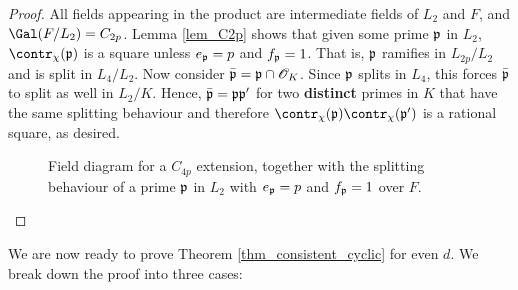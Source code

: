\begin{proof}
    All fields appearing in the product are intermediate fields of $L_2$ and $F$, and $\Gal(F/L_2)=C_{2p}$. Lemma \ref*{lem_C2p} shows that given some prime $\mathfrak{p}$ in $L_2$, $\contr_\chi(\pp)$ is a square unless $e_{\mathfrak{p}}=p$ and $f_{\mathfrak{p}}=1$. That is, $\mathfrak{p}$ ramifies in $L_{2p}/L_2$ and is split in $L_4/L_2$. Now consider $\bar{\mathfrak{p}}=\mathfrak{p}\cap\mathcal{O}_K$. Since $\mathfrak{p}$ splits in $L_4$, this forces $\bar{\mathfrak{p}}$ to split as well in $L_2/K$. Hence, $\bar{\mathfrak{p}}=\mathfrak{p}\mathfrak{p}'$ for two \textbf{distinct} primes in $K$ that have the same splitting behaviour and therefore $\contr_\chi(\pp)\contr_\chi(\pp')$ is a rational square, as desired.

    \begin{figure}[!ht]
        \centering
        \caption[short]{\centering Field diagram for a $C_{4p}$ extension, together with the splitting\\ behaviour of a prime $\mathfrak{p}$ in $L_2$ with $e_{\mathfrak{p}}=p$ and $f_{\mathfrak{p}}=1$ over $F$.}
    \end{figure}
\end{proof}

We are now ready to prove Theorem \ref*{thm_consistent_cyclic} for even $d$. We break down the proof into three cases:


